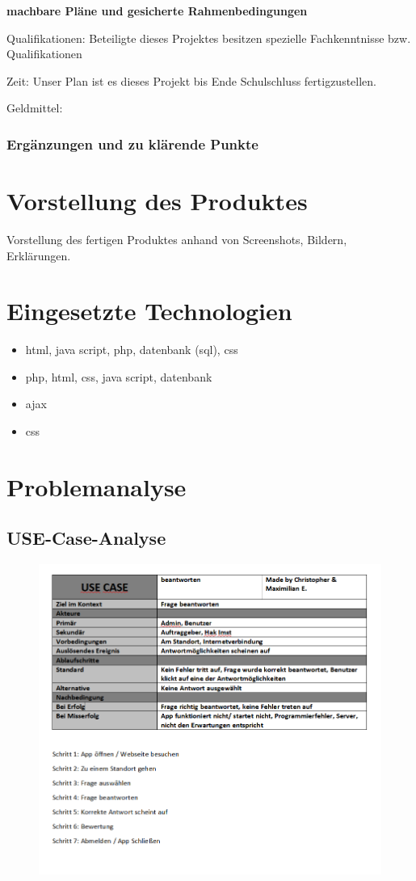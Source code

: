 \textbf {machbare Pläne und gesicherte Rahmenbedingungen}

Qualifikationen: Beteiligte dieses Projektes besitzen spezielle Fachkenntnisse bzw. Qualifikationen

Zeit: Unser Plan ist es dieses Projekt bis Ende Schulschluss fertigzustellen.

Geldmittel: 


\subsection{Ergänzungen und zu klärende Punkte}


\chapter{Vorstellung des Produktes}
Vorstellung des fertigen Produktes anhand von Screenshots, Bildern, Erklärungen.

\chapter{Eingesetzte Technologien}
\begin{itemize}
	\item html, java script, php, datenbank (sql), css
	\item php, html, css, java script, datenbank
	\item ajax
	\item css
\end{itemize}

\chapter{Problemanalyse}
\section{USE-Case-Analyse}


\begin{figure}
	\centering
	\includegraphics[width=1.2\linewidth]{screenshot010}
	\caption{}
	\label{fig:screenshot010}
\end{figure}


